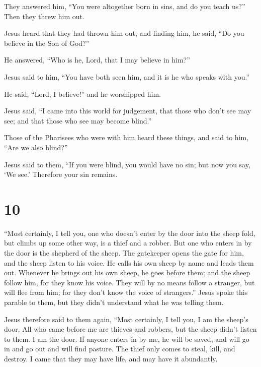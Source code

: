  They answered him, ``You were altogether born in sins,
and do you teach us?'' Then they threw him out.

 Jesus heard that they had thrown him out, and finding
him, he said, ``Do you believe in the Son of God?''

 He answered, ``Who is he, Lord, that I may believe in
him?''

 Jesus said to him, ``You have both seen him, and it is
he who speaks with you.''

 He said, ``Lord, I believe!'' and he worshipped him.

 Jesus said, ``I came into this world for judgement, that
those who don't see may see; and that those who see may become blind.''

 Those of the Pharisees who were with him heard these
things, and said to him, ``Are we also blind?''

 Jesus said to them, ``If you were blind, you would have
no sin; but now you say, `We see.' Therefore your sin remains.

\hypertarget{section-9}{%
\section{10}\label{section-9}}

 ``Most certainly, I tell you, one who doesn't enter by
the door into the sheep fold, but climbs up some other way, is a thief
and a robber.  But one who enters in by the door is the
shepherd of the sheep.  The gatekeeper opens the gate for
him, and the sheep listen to his voice. He calls his own sheep by name
and leads them out.  Whenever he brings out his own sheep,
he goes before them; and the sheep follow him, for they know his voice.
 They will by no means follow a stranger, but will flee
from him; for they don't know the voice of strangers.'' 
Jesus spoke this parable to them, but they didn't understand what he was
telling them.

 Jesus therefore said to them again, ``Most certainly, I
tell you, I am the sheep's door.  All who came before me
are thieves and robbers, but the sheep didn't listen to them.
 I am the door. If anyone enters in by me, he will be
saved, and will go in and go out and will find pasture. 
The thief only comes to steal, kill, and destroy. I came that they may
have life, and may have it abundantly.

